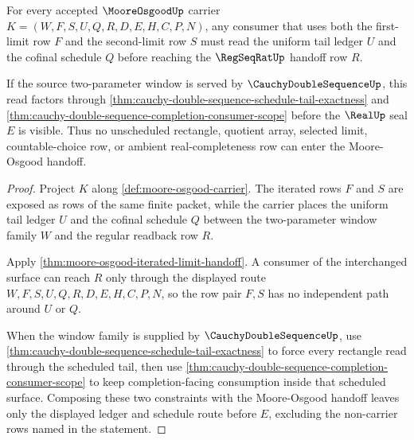 \begin{theorem}\label{thm:moore-osgood-uniform-tail-lock}
For every accepted $\MooreOsgoodUp$ carrier $K=(W,F,S,U,Q,R,D,E,H,C,P,N)$, any consumer that uses both the first-limit row $F$ and the second-limit row $S$ must read the uniform tail ledger $U$ and the cofinal schedule $Q$ before reaching the $\RegSeqRatUp$ handoff row $R$.

If the source two-parameter window is served by $\CauchyDoubleSequenceUp$, this read factors through \autoref{thm:cauchy-double-sequence-schedule-tail-exactness} and \autoref{thm:cauchy-double-sequence-completion-consumer-scope} before the $\RealUp$ seal $E$ is visible. Thus no unscheduled rectangle, quotient array, selected limit, countable-choice row, or ambient real-completeness row can enter the Moore-Osgood handoff.
\end{theorem}
\begin{proof}
Project $K$ along \autoref{def:moore-osgood-carrier}. The iterated rows $F$ and $S$ are exposed as rows of the same finite packet, while the carrier places the uniform tail ledger $U$ and the cofinal schedule $Q$ between the two-parameter window family $W$ and the regular readback row $R$.

Apply \autoref{thm:moore-osgood-iterated-limit-handoff}. A consumer of the interchanged surface can reach $R$ only through the displayed route $W,F,S,U,Q,R,D,E,H,C,P,N$, so the row pair $F,S$ has no independent path around $U$ or $Q$.

When the window family is supplied by $\CauchyDoubleSequenceUp$, use \autoref{thm:cauchy-double-sequence-schedule-tail-exactness} to force every rectangle read through the scheduled tail, then use \autoref{thm:cauchy-double-sequence-completion-consumer-scope} to keep completion-facing consumption inside that scheduled surface. Composing these two constraints with the Moore-Osgood handoff leaves only the displayed ledger and schedule route before $E$, excluding the non-carrier rows named in the statement.
\end{proof}


